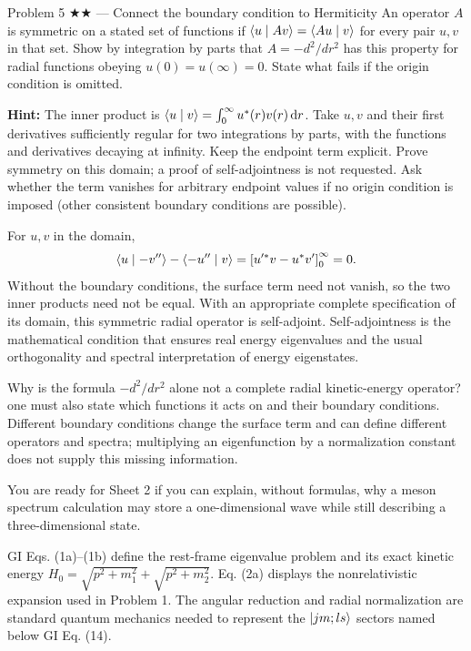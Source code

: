 \documentclass[11pt]{article}
\begin{document}
\begin{problem}{Problem 5 ★★ — Connect the boundary condition to Hermiticity}
An operator $A$ is symmetric on a stated set of functions if
$\langle u\mid Av\rangle=\langle Au\mid v\rangle$ for every pair $u,v$ in that set. Show by
integration by parts that $A=-d^2/dr^2$ has this property for radial functions
obeying $u(0)=u(\infty)=0$. State what fails if the origin condition is omitted.

\textbf{Hint:} The inner product is
$\langle u\mid v\rangle=\int_0^\infty u^*(r)v(r)\,\mathrm d r$. Take $u,v$ and their first
derivatives sufficiently regular for two integrations by parts, with the
functions and derivatives decaying at infinity. Keep the endpoint term
explicit. Prove symmetry on this domain; a proof of self-adjointness is not
requested. Ask whether the term vanishes for arbitrary endpoint values if no
origin condition is imposed (other consistent boundary conditions are possible).
\end{problem}
\begin{solution}
For $u,v$ in the domain,
\[
\langle u\mid -v''\rangle-\langle -u''\mid v\rangle
=\left[u'^*v-u^*v'\right]_0^\infty=0.
\]
Without the boundary conditions, the surface term need not vanish, so the two
inner products need not be equal. With an appropriate complete specification of
its domain, this symmetric radial operator is self-adjoint. Self-adjointness is
the mathematical condition that ensures real energy eigenvalues and the usual
orthogonality and spectral interpretation of energy eigenstates.
\end{solution}
\begin{quiz}
Why is the formula $-d^2/dr^2$ alone not a complete radial kinetic-energy
operator? \answer one must also state which functions it acts on and their
boundary conditions. Different boundary conditions change the surface term and
can define different operators and spectra; multiplying an eigenfunction by a
normalization constant does not supply this missing information.
\end{quiz}

\begin{checkpoint}
You are ready for Sheet 2 if you can explain, without formulas, why a meson
spectrum calculation may store a one-dimensional wave while still describing a
three-dimensional state.
\end{checkpoint}

\begin{paperbridge}
GI Eqs. (1a)--(1b) define the rest-frame eigenvalue problem and its exact
kinetic energy
$H_0=\sqrt{p^2+m_1^2}+\sqrt{p^2+m_2^2}$. Eq. (2a) displays the
nonrelativistic expansion used in Problem 1. The angular reduction and radial
normalization are standard quantum mechanics needed to represent the
$\lvert jm;ls\rangle$ sectors named below GI Eq. (14).
\end{paperbridge}
\end{document}
